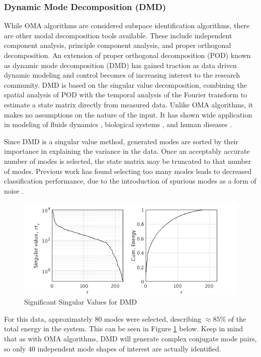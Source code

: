 \subsubsection{Dynamic Mode Decomposition (DMD)}
While OMA algorithms are considered subspace identification algorithms, there are other modal decomposition tools available. These include independent component analysis, principle component analysis, and proper orthogonal decomposition. An extension of proper orthogonal decomposition (POD) known as dynamic mode decomposition (DMD) has gained traction as data driven dynamic modeling and control becomes of increasing interest to the research community. DMD is based on the singular value decomposition, combining the spatial analysis of POD with the temporal analysis of the Fourier transform to estimate a state matrix directly from measured data. Unlike OMA algorithms, it makes no assumptions on the nature of the input. It has shown wide application in modeling of fluids dynamics \cite{schmid2010dynamic}, biological systems \cite{brunton2016extracting}, and human diseases \cite{proctor2015discovering}. 

Since DMD is a singular value method, generated modes are sorted by their importance in explaining the variance in the data. Once an acceptably accurate number of modes is selected, the state matrix may be truncated to that number of modes. Previous work has found selecting too many modes leads to decreased classification performance, due to the introduction of spurious modes as a form of noise \cite{jung1997estimating}.

\begin{figure}
\centering
\includegraphics[scale=0.85]{../../../figures/S_r.png}
\caption{Significant Singular Values for DMD}
\label{fig:svd}
\end{figure}

For this data, approximately 80 modes were selected, describing $\approx 85$\% of the total energy in the system. This can be seen in Figure \ref{fig:svd} below. Keep in mind that as with OMA algorithms, DMD will generate complex conjugate mode pairs, so only 40 independent mode shapes of interest are actually identified. 

